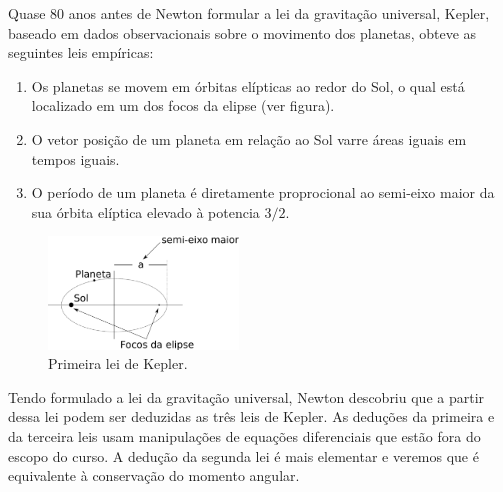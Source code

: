 \documentclass[papersize=a4,DIV=calc,twocolumn=on]{scrartcl}
\theoremstyle{definition}
\begin{document}
Quase 80 anos antes de Newton formular a lei da gravitação universal,
Kepler, baseado em dados observacionais sobre o movimento dos
planetas, obteve as seguintes leis empíricas:
\begin{enumerate}
\item Os planetas se movem em órbitas elípticas ao redor do Sol, o
  qual está localizado em um dos focos da elipse (ver figura).
\item O vetor posição de um planeta em relação ao Sol varre áreas
  iguais em tempos iguais.
\item O período de um planeta é diretamente proprocional ao semi-eixo
  maior da sua órbita elíptica elevado à potencia $3/2$.
\end{enumerate}
\begin{figure}[ht]
  \centering
  \includegraphics[width=0.45\textwidth,keepaspectratio]{orbitaeliptica.pdf}
  \caption{Primeira lei de Kepler.}
  \label{fig:orbitaeliptica}
\end{figure}

Tendo formulado a lei da gravitação universal, Newton descobriu que a
partir dessa lei podem ser deduzidas as três leis de Kepler. As
deduções da primeira e da terceira leis usam manipulações de equações
diferenciais que estão fora do escopo do curso. A dedução da segunda
lei é mais elementar e veremos que é equivalente à conservação do
momento angular.
\end{document}
